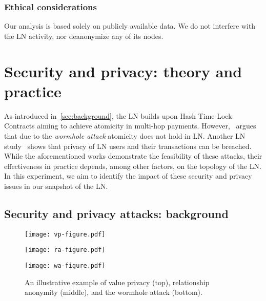 \subsubsection*{Ethical considerations} 
Our analysis is based solely on publicly available data. 
We do not interfere with the LN activity, nor deanonymize any of its nodes. 


\section{Security and privacy: theory and practice}
\label{sec:sec-priv-attacks}

As introduced in~\cref{sec:background}, the LN builds upon Hash Time-Lock Contracts aiming to achieve 
atomicity in multi-hop payments.
However,~\cite{Malavolta2019} argues that due to the \emph{wormhole attack} atomicity does not hold in LN.
Another LN study~\cite{Malavolta2017} shows that privacy of LN users and their transactions can be breached.
While the aforementioned works demonstrate the feasibility of these attacks, 
their effectiveness in practice depends, among other factors, on the topology of the LN.
In this experiment, we aim to identify the impact of these security and privacy issues in our snapshot of the LN.

\subsection{Security and privacy attacks: background}

\begin{figure*}[tb]
	\texttt{[image: vp-figure.pdf]}
	
	\vspace{0.3cm}
	
	\texttt{[image: ra-figure.pdf]}
	
	\vspace{0.3cm}
	
	\texttt{[image: wa-figure.pdf]}
	
	\caption{\label{fig:wormhole-attack} An illustrative example of value privacy (top), relationship anonymity (middle), and the wormhole attack (bottom).}
\end{figure*}

